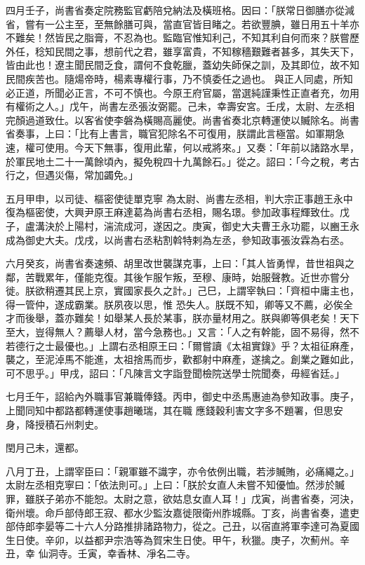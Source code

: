 \begin{pinyinscope}
 四月壬子，尚書省奏定院務監官虧陪兌納法及橫班格。因曰：「朕常日御膳亦從減省，嘗有一公主至，至無餘膳可與，當直官皆目睹之。若欲豐腆，雖日用五十羊亦不難矣！然皆民之脂膏，不忍為也。監臨官惟知利己，不知其利自何而來？朕嘗歷外任，稔知民間之事，想前代之君，雖享富貴，不知稼穡艱難者甚多，其失天下，皆由此也！遼主聞民間乏食，謂何不食乾臘，蓋幼失師保之訓，及其即位，故不知民間疾苦也。隨煬帝時，楊素專權行事，乃不慎委任之過也。
 與正人同處，所知必正道，所聞必正言，不可不慎也。今原王府官屬，當選純謹秉性正直者充，勿用有權術之人。」戊午，尚書左丞張汝弼罷。己未，幸壽安宮。壬戌，太尉、左丞相完顏過道致仕。以客省使李磐為橫賜高麗使。尚書省奏北京轉運使以贓除名。尚書省奏事，上曰：「比有上書言，職官犯除名不可復用，朕謂此言極當。如軍期急速，權可使用。今天下無事，復用此輩，何以戒將來。」又奏：「年前以諸路水旱，於軍民地土二十一萬餘頃內，擬免稅四十九萬餘石。」從之。詔曰：「今之稅，考古行之，但遇災傷，常加蠲免。」



 五月甲申，以司徒、樞密使徒單克寧
 為太尉、尚書左丞相，判大宗正事趙王永中復為樞密使，大興尹原王麻達葛為尚書右丞相，賜名璟。參加政事程輝致仕。戊子，盧溝決於上陽村，湍流成河，遂因之。庚寅，御史大夫曹王永功罷，以豳王永成為御史大夫。戊戌，以尚書右丞粘割斡特剌為左丞，參知政事張汝霖為右丞。



 六月癸亥，尚書省奏速頻、胡里改世襲謀克事，上曰：「其人皆勇悍，昔世祖與之鄰，苦戰累年，僅能克復。其後乍服乍叛，至穆、康時，始服聲教。近世亦嘗分徙。朕欲稍遷其民上京，實國家長久之計。」己巳，上謂宰執曰：「齊桓中庸主也，得一管仲，遂成霸業。朕夙夜以思，惟
 恐失人。朕既不知，卿等又不薦，必俟全才而後舉，蓋亦難矣！如舉某人長於某事，朕亦量材用之。朕與卿等俱老矣！天下至大，豈得無人？薦舉人材，當今急務也。」又言：「人之有幹能，固不易得，然不若德行之士最優也。」上謂右丞相原王曰：「爾嘗讀《太祖實錄》乎？太祖征麻產，襲之，至泥淖馬不能進，太祖捨馬而步，歡都射中麻產，遂擒之。創業之難如此，可不思乎。」甲戌，詔曰：「凡陳言文字詣登聞檢院送學士院聞奏，毋經省廷。」



 七月壬午，詔給內外職事官兼職俸錢。丙申，御史中丞馬惠迪為參知政事。庚子，上聞同知中都路都轉運使事趙曦瑞，其在職
 應錢穀利害文字多不題署，但思安身，降授積石州刺史。



 閏月己未，還都。



 八月丁丑，上謂宰臣曰：「親軍雖不識字，亦令依例出職，若涉贓賄，必痛繩之。」太尉左丞相克寧曰：「依法則可。」上曰：「朕於女直人未嘗不知優恤。然涉於贓罪，雖朕子弟亦不能恕。太尉之意，欲姑息女直人耳！」戊寅，尚書省奏，河決，衛州壞。命戶部侍郎王寂、都水少監汝嘉徙限衛州胙城縣。丁亥，尚書省奏，遣吏部侍郎李晏等二十六人分路推排諸路物力，從之。己丑，以宿直將軍李達可為夏國生日使。辛卯，以益都尹宗浩等為賀宋生日使。甲午，秋獵。庚子，次薊州。辛丑，幸
 仙洞寺。壬寅，幸香林、凈名二寺。




\end{pinyinscope}
